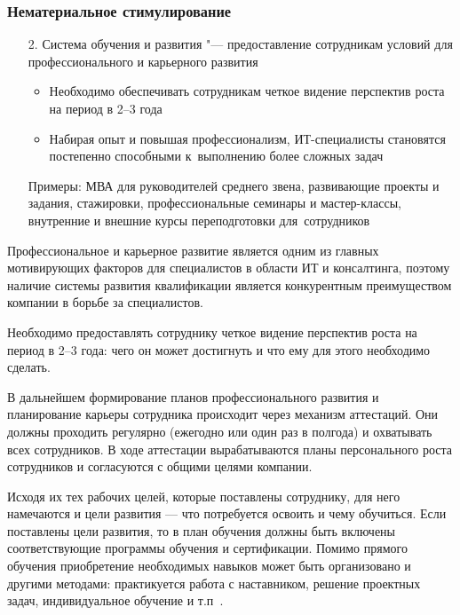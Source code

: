 \documentclass{../industrial-development}
\begin{document}
	\begin{frame} \frametitle{Нематериальное стимулирование}
		\begin{itemize}					
			\item[2.] \alert{Система обучения и развития} "--- предоставление сотрудникам условий для профессионального и карьерного развития
			\begin{itemize}
				\item Необходимо обеспечивать сотрудникам четкое видение перспектив роста на период в 2--3 года
				\item Набирая опыт и повышая профессионализм, ИТ-специалисты
				становятся постепенно способными к~выполнению более сложных задач
			\end{itemize}
			Примеры: МВА для руководителей среднего звена, развивающие проекты и задания, стажировки, профессиональные семинары и мастер-классы, внутренние и внешние курсы переподготовки для~сотрудников
		\end{itemize}
	\end{frame}
	
	\lecturenotes
	
	Профессиональное и карьерное развитие является одним из главных мотивирующих факторов для специалистов в области ИТ и консалтинга, поэтому наличие системы развития квалификации является конкурентным преимуществом компании в борьбе за специалистов.
	
	Необходимо предоставлять сотруднику четкое видение перспектив роста на период в 2--3 года: чего он может достигнуть и что ему для этого необходимо сделать.
	
	В дальнейшем формирование планов профессионального развития и планирование карьеры сотрудника происходит через механизм аттестаций. Они должны проходить регулярно (ежегодно или один раз в полгода) и охватывать всех сотрудников. В ходе аттестации вырабатываются планы персонального роста сотрудников и согласуются с общими целями компании.
	
	Исходя их тех рабочих целей, которые поставлены сотруднику, для него намечаются и цели развития — что потребуется освоить и чему обучиться. Если поставлены цели развития, то в план обучения должны быть включены соответствующие программы обучения и сертификации. Помимо прямого обучения приобретение необходимых навыков может быть организовано и другими методами: практикуется работа с наставником, решение проектных задач, индивидуальное обучение и т.п~\cite{TriKitMotiv}.
	
\end{document}
